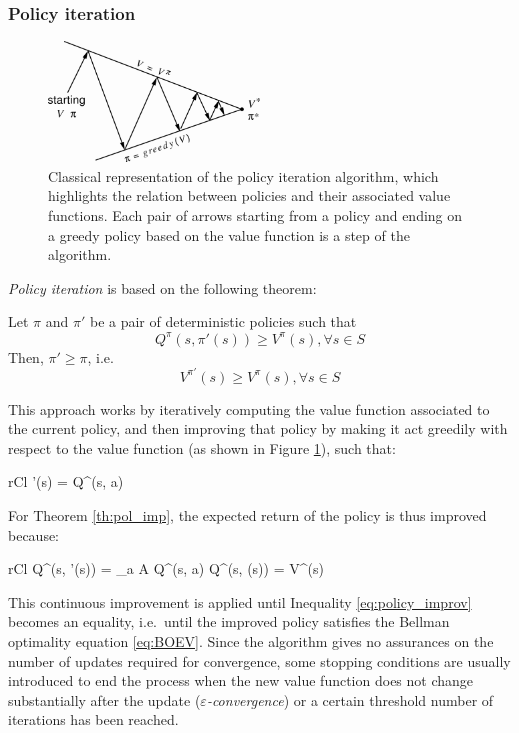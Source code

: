 \subsubsection{Policy iteration}
%
\begin{figure}
    \includegraphics[width=0.5\textwidth]{pictures/policyiter}
    \centering
    \caption[Policy iteration]{Classical representation of the policy iteration 
	    algorithm, which highlights the relation between policies and their 
	    associated value functions. Each pair of arrows starting from a 
	    policy and ending on a greedy policy based on the value function is 
	    a step of the algorithm.}
    \label{f:policyiter}
\end{figure}
%
\textit{Policy iteration} is based on the following theorem:
\begin{theorem} \label{th:pol_imp}
    Let $\pi$ and $\pi'$ be a pair of deterministic policies such that
    \[
        Q^\pi(s, \pi'(s)) \ge V^\pi(s), \forall s \in S 
    \]
    Then, $\pi' \ge \pi$, i.e.\ 
    \[
        V^{\pi'}(s) \ge V^{\pi}(s), \forall s \in S
    \]
\end{theorem}

This approach works by iteratively computing the value function associated to 
the current policy, and then improving that policy by making it act greedily 
with respect to the value function (as shown in Figure \ref{f:policyiter}), such
that:
%
\begin{IEEEeqnarray}{rCl}
    \pi'(s) =  Q^{\pi}(s, a) \label{eq:greedy_imp}
\end{IEEEeqnarray}
%
For Theorem \ref{th:pol_imp}, the expected return of the policy is thus improved
because:
%
\begin{IEEEeqnarray}{rCl}	
    Q^\pi(s, \pi'(s)) = \max_{a \in A} Q^\pi(s, a) \ge Q^\pi(s, \pi(s)) = V^\pi(s) \label{eq:policy_improv}
\end{IEEEeqnarray}
%
This continuous improvement is applied until Inequality \eqref{eq:policy_improv} 
becomes an equality, i.e.\ until the improved policy satisfies the 
Bellman optimality equation \eqref{eq:BOEV}. Since the algorithm gives no 
assurances on the number of updates required for convergence, some stopping
conditions are usually introduced to end the process when the new value function 
does not change substantially after the update 
(\textit{$\varepsilon$-convergence}) or a certain threshold number of iterations
has been reached.

